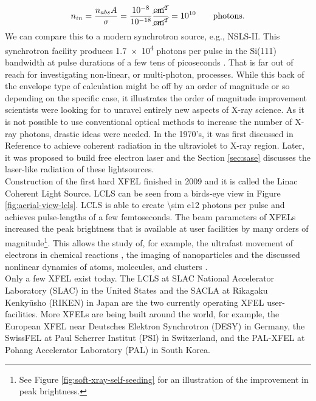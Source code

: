 \begin{equation}
n_{in} = \frac{n_{abs} A}{\sigma} = \frac{10^{-8}}{10^{-18}}\si[per-mode = fraction]{\cancel\square\centi\meter\per\cancel\square\centi\meter}=10^{10}\qquad \mathrm{photons.}
\label{eq:absorption-cross-section}
\end{equation}
We can compare this to a modern synchrotron source, e.g., NSLS-II. This synchrotron facility produces \num{1.7e4} photons per pulse in the Si(111) bandwidth at pulse durations of a few tens of picoseconds \citep{Williams-2016-PC}. That is far out of reach for investigating non-linear, or multi-photon, processes. While this back of the envelope type of calculation might be off by an order of magnitude or so depending on the specific case, it illustrates the order of magnitude improvement scientists were looking for to unravel entirely new aspects of X-ray science. As it is not possible to use conventional optical methods to increase the number of X-ray photons, drastic ideas were needed. In the 1970's, it was first discussed in Reference \citep{Madey-1971-JAP} to achieve coherent radiation in the ultraviolet to X-ray region. Later, it was proposed to build free electron laser \citep{Kondratenko-1980-PA,Bonifacio-1984-OC} and the Section \ref{sec:sase} discusses the laser-like radiation of these lightsources.\\[1\baselineskip]
%
Construction of the first hard XFEL finished in 2009 and it is called the Linac Coherent Light Source. LCLS can be seen from a birds-eye view in Figure \ref{fig:aerial-view-lcls}. LCLS is able to create \num{\sim e12} photons per pulse and achieves pulse-lengths of a few femtoseconds. The beam parameters of XFELs increased the peak brightness that is available at user facilities by many orders of magnitude\footnote{See Figure \ref{fig:soft-xray-self-seeding} for an illustration of the improvement in peak brightness.}. This allows the study of, for example, the ultrafast movement of electrons in chemical reactions \citep{Dell-Angela-2013-Science,Picon-2016-NatComm}, the imaging of nanoparticles \citep{Chapman-2011-Nature,Seibert-2011-Nature} and the discussed nonlinear dynamics of atoms, molecules, and clusters \citep{Young-2010-Nature,Rohringer-2012-Nature,Berrah-2011-PNAS,Gorkhover-2012-PRL}.\\[1\baselineskip]
%
Only a few XFEL exist today. The LCLS at SLAC National Accelerator Laboratory (SLAC) in the United States and the SACLA at Rikagaku Kenkyūsho (RIKEN) in Japan are the two currently operating XFEL user-facilities. More XFELs are being built around the world, for example, the European XFEL near Deutsches Elektron Synchrotron (DESY) in Germany, the SwissFEL at Paul Scherrer Institut (PSI) in Switzerland, and the PAL-XFEL at Pohang Accelerator Laboratory (PAL) in South Korea.
%
%
%
